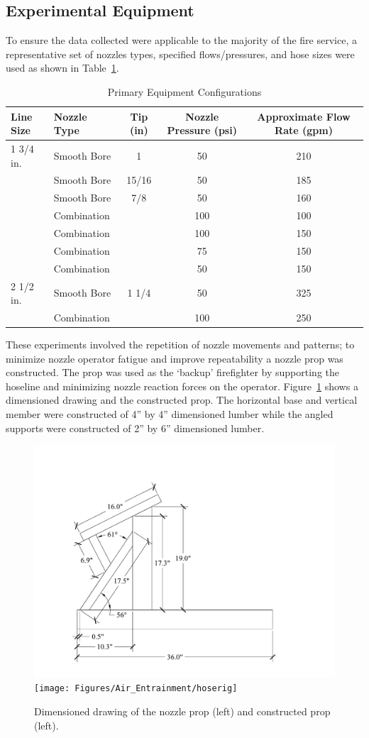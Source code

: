 \documentclass[12pt,oneside]{book}
\begin{document}
\subsection{Experimental Equipment}

To ensure the data collected were applicable to the majority of the fire service, a representative set of nozzles types, specified flows/pressures, and hose sizes were used as shown in Table~\ref{tab:nozzles_used_detail}.

\begin{table}[!ht]
\centering
\caption{Primary Equipment Configurations}
\label{tab:nozzles_used_detail}
\begin{tabular}{llccc}
\toprule[1.5pt]
Line Size & Nozzle Type & Tip (in) & Nozzle Pressure (psi) & Approximate Flow Rate (gpm) \\ 
\midrule
1 3/4 in. & Smooth Bore          & 1      & 50 & 210 \\
          & Smooth Bore          & 15/16  & 50 & 185 \\
          & Smooth Bore          & 7/8    & 50 & 160 \\
          & Combination          &        & 100 & 100 \\
          & Combination          &        & 100 & 150 \\
          & Combination          &        & 75 & 150 \\
          & Combination          &        & 50 & 150 \\ \midrule
2 1/2 in. & Smooth Bore          & 1 1/4  & 50 & 325 \\
          & Combination          &        & 100 & 250 \\
\bottomrule[1.25pt]
\end{tabular}
\end{table}

These experiments involved the repetition of nozzle movements and patterns; to minimize nozzle operator fatigue and improve repeatability a nozzle prop was constructed. The prop was used as the `backup' firefighter by supporting the hoseline and minimizing nozzle reaction forces on the operator. Figure~\ref{fig:Nozzle_Prop} shows a dimensioned drawing and the constructed prop. The horizontal base and vertical member were constructed of 4'' by 4'' dimensioned lumber while the angled supports were constructed of 2'' by 6'' dimensioned lumber.

\begin{figure}[!ht]
\centering
    \includegraphics[width=.4\columnwidth]{Figures/Water_Distribution/GIBside}
	\texttt{[image: Figures/Air\_Entrainment/hoserig]}
	\caption[Nozzle Prop]{Dimensioned drawing of the nozzle prop (left) and constructed prop (left).}
	\label{fig:Nozzle_Prop}
\end{figure}
\end{document}
